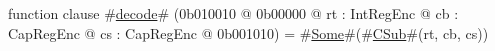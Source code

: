 function clause #\hyperref[zdecode]{decode}# (0b010010 @ 0b00000 @ rt : IntRegEnc @ cb : CapRegEnc @ cs : CapRegEnc @ 0b001010) = #\hyperref[zSome]{Some}#(#\hyperref[zCSub]{CSub}#(rt, cb, cs))
